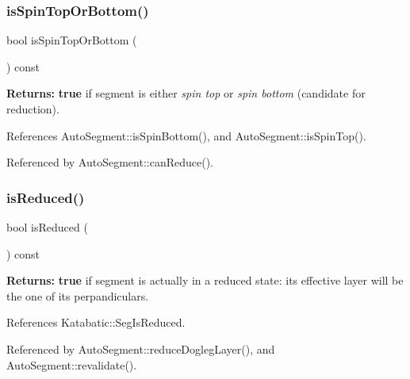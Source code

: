 \subsubsection{\texorpdfstring{is\+Spin\+Top\+Or\+Bottom()}{isSpinTopOrBottom()}}
{\footnotesize\ttfamily bool is\+Spin\+Top\+Or\+Bottom (\begin{DoxyParamCaption}{ }\end{DoxyParamCaption}) const\hspace{0.3cm}{\ttfamily [inline]}}

{\bfseries Returns\+:} {\bfseries true} if segment is either {\itshape spin top} or {\itshape spin bottom} (candidate for reduction). 

References Auto\+Segment\+::is\+Spin\+Bottom(), and Auto\+Segment\+::is\+Spin\+Top().



Referenced by Auto\+Segment\+::can\+Reduce().

\mbox{\label{classKatabatic_1_1AutoSegment_a461c31a8d12458939b78ccecb3b8c299}} 
\subsubsection{\texorpdfstring{is\+Reduced()}{isReduced()}}
{\footnotesize\ttfamily bool is\+Reduced (\begin{DoxyParamCaption}{ }\end{DoxyParamCaption}) const\hspace{0.3cm}{\ttfamily [inline]}}

{\bfseries Returns\+:} {\bfseries true} if segment is actually in a reduced state\+: it\textquotesingle{}s effective layer will be the one of it\textquotesingle{}s perpandiculars. 

References Katabatic\+::\+Seg\+Is\+Reduced.



Referenced by Auto\+Segment\+::reduce\+Dogleg\+Layer(), and Auto\+Segment\+::revalidate().

\mbox{\label{classKatabatic_1_1AutoSegment_a62d61c231cf404a814ae37665fa8164f}} 
